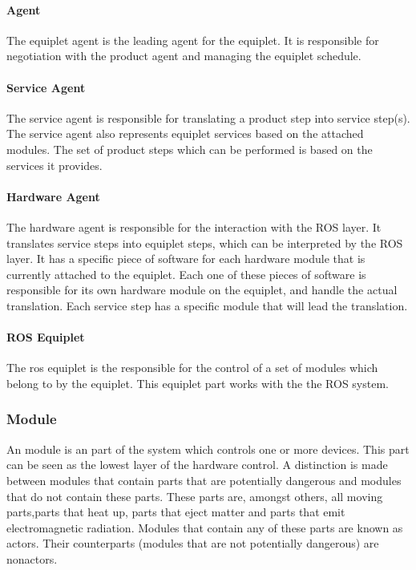 \documentclass[12pt,a4paper]{report}
\begin{document}
\paragraph{Agent}
The equiplet agent is the leading agent for the equiplet. It is responsible for negotiation with the product agent and managing the equiplet schedule.\cite{REXOS_Design}
\paragraph{Service Agent}
The service agent is responsible for translating a product step into service step(s). The service agent also represents equiplet services based on the attached modules. The set of product steps which can be performed is based on the services it provides.\cite{REXOS_Design}
\paragraph{Hardware Agent}
The hardware agent is responsible for the interaction with the ROS layer. It translates service steps into equiplet steps, which can be interpreted by the ROS layer. It has a specific piece of software for each hardware module that is currently attached to the equiplet. Each one of these pieces of software is responsible for its own hardware module on the equiplet, and handle the actual translation. Each service step has a specific module that will lead the translation. \cite{REXOS_Design}
\paragraph{ROS Equiplet}
The ros equiplet is the responsible for the control of a set of modules which belong to by the equiplet. This equiplet part works with the the ROS system.

\subsubsection{Module}
An module is an part of the system which controls one or more devices. This part can be seen as the lowest layer of the hardware control. A distinction is made between modules that contain parts that are potentially dangerous and modules that do not contain these parts. These parts are, amongst others, all moving parts,parts that heat up, parts that eject matter and parts that emit electromagnetic radiation. Modules that contain any of these parts are known as actors. Their counterparts (modules that are not potentially dangerous) are nonactors.\cite{mast_funcional_design}
\end{document}
